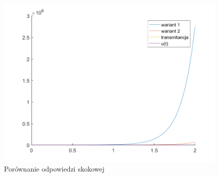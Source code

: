\documentclass{article}
\begin{document}
\begin{figure}[H]
\centering
\includegraphics[width=0.9\linewidth]{z3a}
\caption{Porównanie odpowiedzi skokowej}
\label{fig:z3a}
\end{figure}
\end{document}
